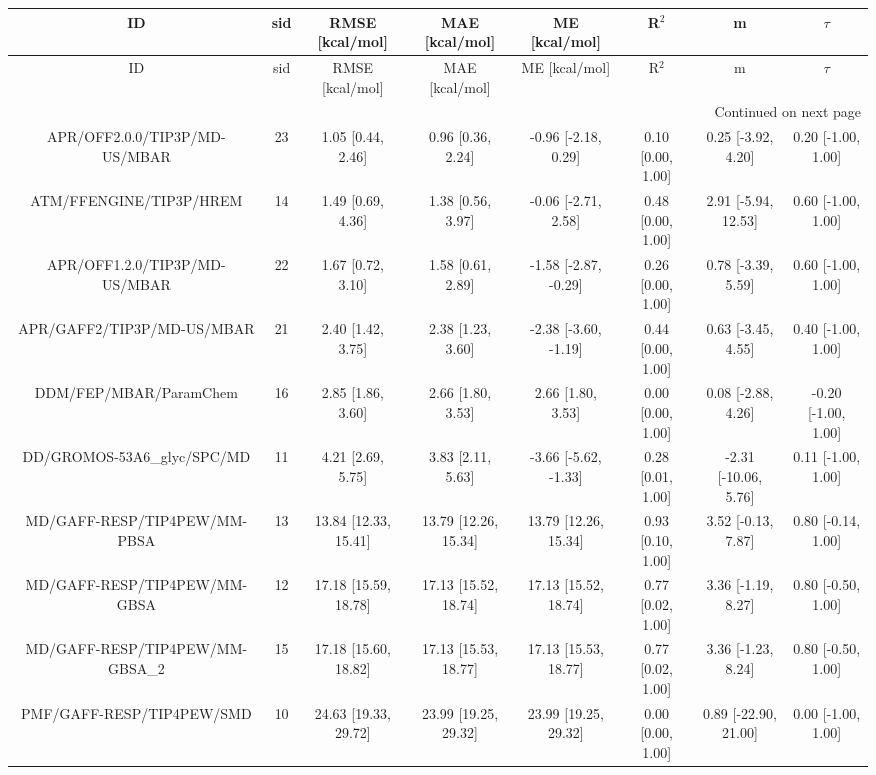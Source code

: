 \documentclass[8pt]{article}
\begin{document}
\begin{center}
\begin{footnotesize}
\begin{longtable}{|cccccccc|}
\toprule
                             ID & sid &      RMSE [kcal/mol] &       MAE [kcal/mol] &        ME [kcal/mol] &             R$^2$ &                    m &              $\tau$ \\
\midrule
\endfirsthead

\toprule
                             ID & sid &      RMSE [kcal/mol] &       MAE [kcal/mol] &        ME [kcal/mol] &             R$^2$ &                    m &              $\tau$ \\
\midrule
\endhead
\midrule
\multicolumn{8}{r}{{Continued on next page}} \\
\midrule
\endfoot

\bottomrule
\endlastfoot
  APR/OFF2.0.0/TIP3P/MD-US/MBAR &  23 &    1.05 [0.44, 2.46] &    0.96 [0.36, 2.24] &  -0.96 [-2.18, 0.29] & 0.10 [0.00, 1.00] &   0.25 [-3.92, 4.20] &  0.20 [-1.00, 1.00] \\
        ATM/FFENGINE/TIP3P/HREM &  14 &    1.49 [0.69, 4.36] &    1.38 [0.56, 3.97] &  -0.06 [-2.71, 2.58] & 0.48 [0.00, 1.00] &  2.91 [-5.94, 12.53] &  0.60 [-1.00, 1.00] \\
  APR/OFF1.2.0/TIP3P/MD-US/MBAR &  22 &    1.67 [0.72, 3.10] &    1.58 [0.61, 2.89] & -1.58 [-2.87, -0.29] & 0.26 [0.00, 1.00] &   0.78 [-3.39, 5.59] &  0.60 [-1.00, 1.00] \\
     APR/GAFF2/TIP3P/MD-US/MBAR &  21 &    2.40 [1.42, 3.75] &    2.38 [1.23, 3.60] & -2.38 [-3.60, -1.19] & 0.44 [0.00, 1.00] &   0.63 [-3.45, 4.55] &  0.40 [-1.00, 1.00] \\
         DDM/FEP/MBAR/ParamChem &  16 &    2.85 [1.86, 3.60] &    2.66 [1.80, 3.53] &    2.66 [1.80, 3.53] & 0.00 [0.00, 1.00] &   0.08 [-2.88, 4.26] & -0.20 [-1.00, 1.00] \\
    DD/GROMOS-53A6\_glyc/SPC/MD &  11 &    4.21 [2.69, 5.75] &    3.83 [2.11, 5.63] & -3.66 [-5.62, -1.33] & 0.28 [0.01, 1.00] & -2.31 [-10.06, 5.76] &  0.11 [-1.00, 1.00] \\
   MD/GAFF-RESP/TIP4PEW/MM-PBSA &  13 & 13.84 [12.33, 15.41] & 13.79 [12.26, 15.34] & 13.79 [12.26, 15.34] & 0.93 [0.10, 1.00] &   3.52 [-0.13, 7.87] &  0.80 [-0.14, 1.00] \\
   MD/GAFF-RESP/TIP4PEW/MM-GBSA &  12 & 17.18 [15.59, 18.78] & 17.13 [15.52, 18.74] & 17.13 [15.52, 18.74] & 0.77 [0.02, 1.00] &   3.36 [-1.19, 8.27] &  0.80 [-0.50, 1.00] \\
MD/GAFF-RESP/TIP4PEW/MM-GBSA\_2 &  15 & 17.18 [15.60, 18.82] & 17.13 [15.53, 18.77] & 17.13 [15.53, 18.77] & 0.77 [0.02, 1.00] &   3.36 [-1.23, 8.24] &  0.80 [-0.50, 1.00] \\
      PMF/GAFF-RESP/TIP4PEW/SMD &  10 & 24.63 [19.33, 29.72] & 23.99 [19.25, 29.32] & 23.99 [19.25, 29.32] & 0.00 [0.00, 1.00] & 0.89 [-22.90, 21.00] &  0.00 [-1.00, 1.00] \\
\end{longtable}
\end{footnotesize}
\end{center}
\end{document}
